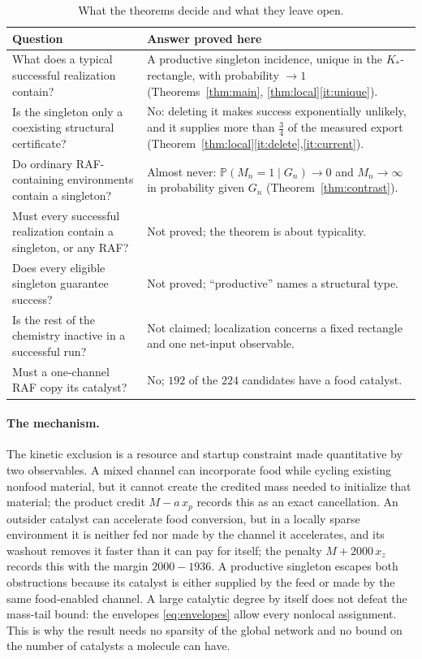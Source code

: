 \documentclass[11pt,letterpaper]{article}
\theoremstyle{plain}
\theoremstyle{definition}
\theoremstyle{remark}
\numberwithin{equation}{section}
\newcommand{\PP}{\mathbb P}
\begin{document}
\begin{table}[t]
\centering\small
\begin{tabular}{@{}p{.50\linewidth}p{.44\linewidth}@{}}
\toprule
Question & Answer proved here\\
\midrule
What does a typical successful realization contain? & A productive singleton incidence, unique in the $K_*$-rectangle, with probability $\to1$ (Theorems~\ref{thm:main}, \ref{thm:local}\ref{it:unique}).\\[2pt]
Is the singleton only a coexisting structural certificate? & No: deleting it makes success exponentially unlikely, and it supplies more than $\tfrac34$ of the measured export (Theorem~\ref{thm:local}\ref{it:delete},\ref{it:current}).\\[2pt]
Do ordinary RAF-containing environments contain a singleton? & Almost never: $\PP(M_n=1\mid G_n)\to0$ and $M_n\to\infty$ in probability given $G_n$ (Theorem~\ref{thm:contrast}).\\[2pt]
Must every successful realization contain a singleton, or any RAF? & Not proved; the theorem is about typicality.\\[2pt]
Does every eligible singleton guarantee success? & Not proved; ``productive'' names a structural type.\\[2pt]
Is the rest of the chemistry inactive in a successful run? & Not claimed; localization concerns a fixed rectangle and one net-input observable.\\[2pt]
Must a one-channel RAF copy its catalyst? & No; $192$ of the $224$ candidates have a food catalyst.\\
\bottomrule
\end{tabular}
\caption{What the theorems decide and what they leave open.}
\label{tab:questions}
\end{table}

\paragraph{The mechanism.}
The kinetic exclusion is a resource and startup constraint made quantitative by two observables. A mixed channel can incorporate food while cycling existing nonfood material, but it cannot create the credited mass needed to initialize that material; the product credit $M-a\,x_p$ records this as an exact cancellation. An outsider catalyst can accelerate food conversion, but in a locally sparse environment it is neither fed nor made by the channel it accelerates, and its washout removes it faster than it can pay for itself; the penalty $M+2000\,x_z$ records this with the margin $2000-1936$. A productive singleton escapes both obstructions because its catalyst is either supplied by the feed or made by the same food-enabled channel. A large catalytic degree by itself does not defeat the mass-tail bound: the envelopes \eqref{eq:envelopes} allow every nonlocal assignment. This is why the result needs no sparsity of the global network and no bound on the number of catalysts a molecule can have.
\end{document}
